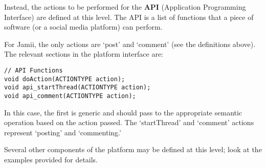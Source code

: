 Instead, the actions to be performed for the \textbf{API} (Application Programming Interface) are defined at this level. The API is a list of functions that a piece of software (or a social media platform) can perform.

For Jamii,  the only actions are `post' and `comment' (see the definitions above). The relevant sections in the platform interface are:

\begin{lstlisting}
// API Functions
void doAction(ACTIONTYPE action);
void api_startThread(ACTIONTYPE action);
void api_comment(ACTIONTYPE action);
\end{lstlisting} 

In this case, the first is generic and should pass to the appropriate semantic operation based on the action passed. The `startThread' and `comment' actions represent `posting' and `commenting.'

Several other components of the platform may be defined at this level; look at the examples provided for details.

